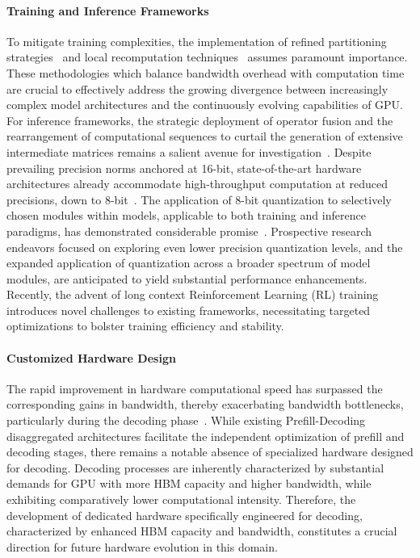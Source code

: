 \documentclass[11pt, a4paper, logo, copyright, nonumbering]{map}
\begin{document}
\paragraph{Training and Inference Frameworks}  To mitigate training complexities, the implementation of refined partitioning strategies~\citep{qi2023zero} and local recomputation techniques~\citep{korthikanti2023reducing} assumes paramount importance. These methodologies which balance bandwidth overhead with computation time are crucial to effectively address the growing divergence between increasingly complex model architectures and the continuously evolving capabilities of GPU. For inference frameworks, the strategic deployment of operator fusion and the rearrangement of computational sequences to curtail the generation of extensive intermediate matrices remains a salient avenue for investigation~\citep{dao2022flashattention,dao2024flashattention,shah2025flashattention}. Despite prevailing precision norms anchored at 16-bit, state-of-the-art hardware architectures already accommodate high-throughput computation at reduced precisions, down to 8-bit~\citep{nvidia_h200}. The application of 8-bit quantization to selectively chosen modules within models, applicable to both training and inference paradigms, has demonstrated considerable promise~\citep{liu2024deepseek}.  Prospective research endeavors focused on exploring even lower precision quantization levels, and the expanded application of quantization across a broader spectrum of model modules, are anticipated to yield substantial performance enhancements.
Recently, the advent of long context Reinforcement Learning (RL) training~\citep{guo2025deepseek} introduces novel challenges to existing frameworks, necessitating targeted optimizations to bolster training efficiency and stability. 

\paragraph{Customized Hardware Design} The rapid improvement in hardware computational speed has surpassed the corresponding gains in bandwidth, thereby exacerbating bandwidth bottlenecks, particularly during the decoding phase~\citep{gholami2024ai}.  While existing Prefill-Decoding disaggregated architectures facilitate the independent optimization of prefill and decoding stages, there remains a notable absence of specialized hardware designed for decoding. Decoding processes are inherently characterized by substantial demands for GPU with more HBM capacity and higher bandwidth, while exhibiting comparatively lower computational intensity. Therefore, the development of dedicated hardware specifically engineered for decoding, characterized by enhanced HBM capacity and bandwidth, constitutes a crucial direction for future hardware evolution in this domain.
\end{document}
